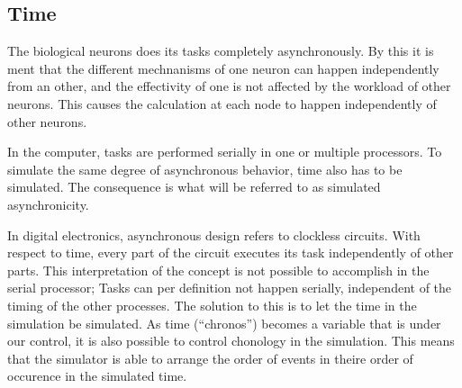 	




	\subsection{Time}
	\label{ssecTime}
	The biological neurons does its tasks completely asynchronously.
	By this it is ment that the different mechnanisms of one neuron can happen independently from an other, and the effectivity of one is not affected by the workload of other neurons.
	This causes the calculation at each node to happen independently of other neurons.


	In the computer, tasks are performed serially in one or multiple processors.
	To simulate the same degree of asynchronous behavior, time also has to be simulated. %
	The consequence is what will be referred to as simulated asynchronicity.

	In digital electronics, asynchronous design refers to clockless circuits. 
	With respect to time, every part of the circuit executes its task independently of other parts.
	This interpretation of the concept is not possible to accomplish in the serial processor; Tasks can per definition not happen serially, independent of the timing of the other processes.
	The solution to this is to let the time in the simulation be simulated.
	As time (``chronos'') becomes a variable that is under our control, it is also possible to control chonology in the simulation. %
	This means that the simulator is able to arrange the order of events in theire order of occurence in the simulated time. %
	
